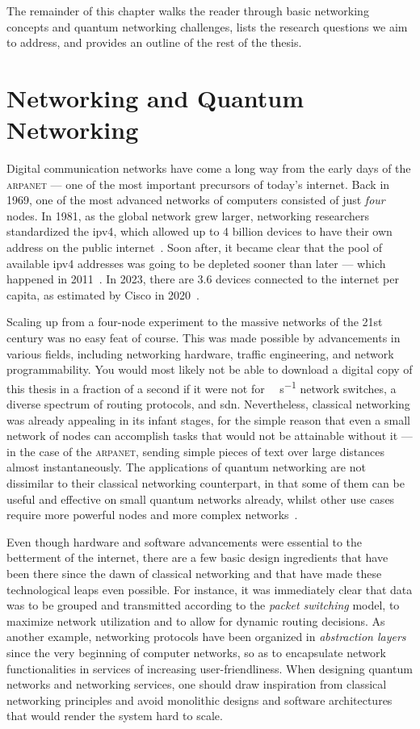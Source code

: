 The remainder of this chapter walks the reader through basic networking concepts and quantum
networking challenges, lists the research questions we aim to address, and provides an outline of
the rest of the thesis.

\section{Networking and Quantum Networking}

Digital communication networks have come a long way from the early days of the \textsc{arpanet} ---
one of the most important precursors of today's internet. Back in 1969, one of the most advanced
networks of computers consisted of just \emph{four} nodes. In 1981, as the global network grew
larger, networking researchers standardized the \acrfull{ipv4}, which allowed up to \num{4} billion
devices to have their own address on the public internet~\cite{rfc_791}. Soon after, it became clear
that the pool of available \acrshort{ipv4} addresses was going to be depleted sooner than later ---
which happened in 2011~\cite{icann_2011}. In 2023, there are \num{3.6} devices connected to the
internet per capita, as estimated by Cisco in 2020~\cite{cisco_2020}.

Scaling up from a four-node experiment to the massive networks of the 21st century was no easy feat
of course. This was made possible by advancements in various fields, including networking hardware,
traffic engineering, and network programmability. You would most likely not be able to download a
digital copy of this thesis in a fraction of a second if it were not for \unit{\tera\bit\per\second}
network switches, a diverse spectrum of routing protocols, and \acrlong{sdn}. Nevertheless,
classical networking was already appealing in its infant stages, for the simple reason that even a
small network of nodes can accomplish tasks that would not be attainable without it --- in the case
of the \textsc{arpanet}, sending simple pieces of text over large distances almost instantaneously.
The applications of quantum networking are not dissimilar to their classical networking counterpart,
in that some of them can be useful and effective on small quantum networks already, whilst other use
cases require more powerful nodes and more complex networks~\cite{wehner_2018_stages}.

Even though hardware and software advancements were essential to the betterment of the internet,
there are a few basic design ingredients that have been there since the dawn of classical networking
and that have made these technological leaps even possible. For instance, it was immediately clear
that data was to be grouped and transmitted according to the \emph{packet switching} model, to
maximize network utilization and to allow for dynamic routing decisions. As another example,
networking protocols have been organized in \emph{abstraction layers} since the very beginning of
computer networks, so as to encapsulate network functionalities in services of increasing
user-friendliness. When designing quantum networks and networking services, one should draw
inspiration from classical networking principles and avoid monolithic designs and software
architectures that would render the system hard to scale.

